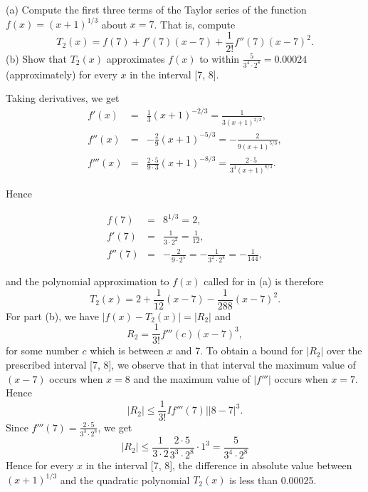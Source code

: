\begin{example}
(a) Compute the first three terms of the Taylor series of the function $f(x) = (x +1)^{1/3}$ about $x = 7$. That is, compute
$$
T_2(x) = f(7) + f'(7)(x-7) + \frac{1}{2!} f''(7)(x-7)^2 .
$$
\noindent (b) Show that $T_2(x)$ approximates $f(x)$ to within $\frac{5}{3^4 \cdot 2^8} = 0.00024$ (approximately) for every $x$ in the interval [7, 8].

Taking derivatives, we get 
\begin{eqnarray*}
f'(x) &=& \frac{1}{3} (x + 1)^{-2/3} = \frac{1}{3(x+1)^{2/3}}, \\
f''(x) &=& - \frac{2}{9}(x + 1)^{-5/3} = -\frac{2}{9(x+1)^{5/3}}, \\
f'''(x) &=& \frac{2 \cdot 5}{9 \cdot 3} (x + 1)^{-8/3} = \frac{2 \cdot 5}{3^3(x + 1 )^{8/3}} . 
\end{eqnarray*}

\noindent Hence 

\begin{eqnarray*}
f(7) &=& 8^{1/3} = 2,\\
f'(7) &=& \frac{1}{3 \cdot 2^2} = \frac{1}{12},\\
f''(7) &=& -\frac{2}{9 \cdot 2^5} = - \frac{1}{3^2 \cdot 2^4} = - \frac{1}{144} , 
\end{eqnarray*}

\noindent and the polynomial approximation to $f(x)$ called for in (a) is therefore
$$
T_2(x) = 2 + \frac{1}{12}(x-7) - \frac{1}{288}(x - 7)^2 .
$$
For part (b), we have $|f(x)-T_2(x)| = |R_2|$ and
$$
R_2 = \frac{1}{3!} f'''(c)(x-7)^3,
$$
\noindent for some number $c$ which is between $x$ and 7. To obtain a bound for $|R_2|$ over the prescribed interval [7, 8], we observe that in that interval the
maximum value of $(x - 7)$ occurs when $x = 8$ and the maximum value of $|f'''|$ occurs when $x = 7$. Hence
$$
|R_2| \leq \frac{1}{3!} If'''(7)| |8 - 7|^3 . 
$$
\noindent Since $f'''(7) = \frac{2 \cdot 5}{3^3 \cdot 2^8}$, we get
$$
|R_2| \leq \frac{1}{3 \cdot 2} \frac{2 \cdot 5}{3^3 \cdot 2^8} \cdot 1^3 = \frac{5}{3^4 \cdot 2^8}
$$
\noindent Hence for every $x$ in the interval [7, 8], the difference in absolute value between $(x + 1)^{1/3}$ and the quadratic polynomial $T_2(x)$ is less than 0.00025.
\end{example}

